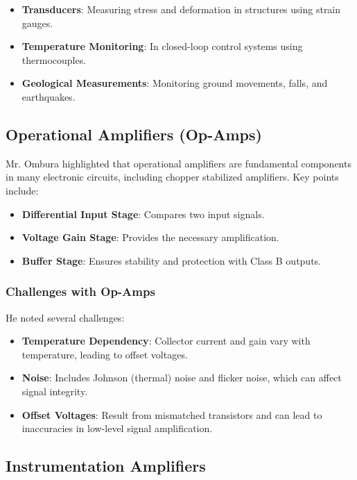 \begin{itemize}
    \item \textbf{Transducers}: Measuring stress and deformation in structures using strain gauges.
    \item \textbf{Temperature Monitoring}: In closed-loop control systems using thermocouples.
    \item \textbf{Geological Measurements}: Monitoring ground movements, falls, and earthquakes.
\end{itemize}

\subsection{Operational Amplifiers (Op-Amps)}

Mr. Ombura highlighted that operational amplifiers are fundamental components in many electronic circuits, including chopper stabilized amplifiers. Key points include:

\begin{itemize}
    \item \textbf{Differential Input Stage}: Compares two input signals.
    \item \textbf{Voltage Gain Stage}: Provides the necessary amplification.
    \item \textbf{Buffer Stage}: Ensures stability and protection with Class B outputs.
\end{itemize}

\subsubsection{Challenges with Op-Amps}

He noted several challenges:

\begin{itemize}
    \item \textbf{Temperature Dependency}: Collector current and gain vary with temperature, leading to offset voltages.
    \item \textbf{Noise}: Includes Johnson (thermal) noise and flicker noise, which can affect signal integrity.
    \item \textbf{Offset Voltages}: Result from mismatched transistors and can lead to inaccuracies in low-level signal amplification.
\end{itemize}

\subsection{Instrumentation Amplifiers}

